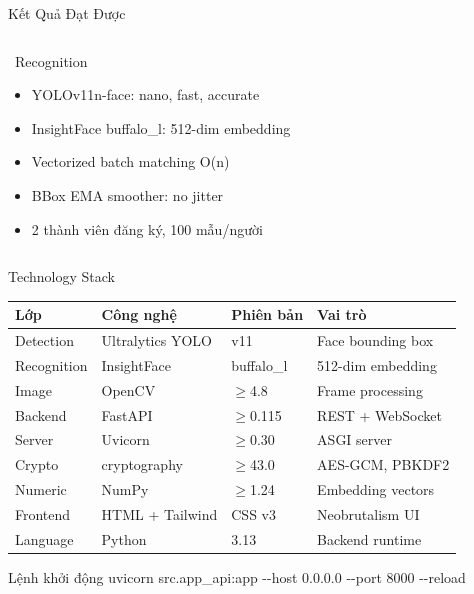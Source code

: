 \documentclass[aspectratio=169, 12pt]{beamer}
\newcommand{\cmark}{\textcolor{darkgreen}{\ding{51}}}
\begin{document}
\begin{frame}{Kết Quả Đạt Được}
\begin{columns}[T]
\begin{block}{\cmark\ Recognition}
\begin{itemize}\footnotesize
  \item YOLOv11n-face: nano, fast, accurate
  \item InsightFace buffalo\_l: 512-dim embedding
  \item Vectorized batch matching O(n)
  \item BBox EMA smoother: no jitter
  \item 2 thành viên đăng ký, 100 mẫu/người
\end{itemize}
\end{block}
\end{columns}
\end{frame}

\begin{frame}{Technology Stack}
\begin{center}
\begin{tabular}{llll}
\toprule
\textbf{Lớp} & \textbf{Công nghệ} & \textbf{Phiên bản} & \textbf{Vai trò} \\
\midrule
Detection & Ultralytics YOLO & v11 & Face bounding box \\
Recognition & InsightFace & buffalo\_l & 512-dim embedding \\
Image & OpenCV & $\geq$4.8 & Frame processing \\
Backend & FastAPI & $\geq$0.115 & REST + WebSocket \\
Server & Uvicorn & $\geq$0.30 & ASGI server \\
Crypto & cryptography & $\geq$43.0 & AES-GCM, PBKDF2 \\
Numeric & NumPy & $\geq$1.24 & Embedding vectors \\
Frontend & HTML + Tailwind & CSS v3 & Neobrutalism UI \\
Language & Python & 3.13 & Backend runtime \\
\bottomrule
\end{tabular}
\end{center}

\vspace{0.5em}
\begin{block}{Lệnh khởi động}
\centering\ttfamily\small
uvicorn src.app\_api:app -{}-host 0.0.0.0 -{}-port 8000 -{}-reload
\end{block}
\end{frame}
\end{document}
